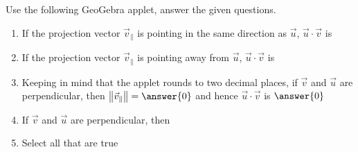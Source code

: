 \documentclass{ximera}
\begin{document}
\begin{exploration}
   Use the following GeoGebra applet, answer the given questions.

   \begin{center}
   \end{center}



   \begin{enumerate}
      \item If the projection vector $\vec{v}_\parallel$ is pointing in the same direction as $\vec{u}$, $\vec{u}\cdot\vec{v}$ is 

      \item If the projection vector $\vec{v}_\parallel$ is pointing away from $\vec{u}$, $\vec{u}\cdot\vec{v}$ is 

      \item Keeping in mind that the applet rounds to two decimal places, if $\vec{v}$ and $\vec{u}$ are perpendicular, then $\left\|\vec{v}_\parallel\right\|=\answer{0}$ and hence $\vec{u}\cdot\vec{v}$ is $\answer{0}$

      \item If $\vec{v}$ and $\vec{u}$ are perpendicular, then \begin{selectAll}
      \end{selectAll}

      \item Select all that are true \begin{selectAll}

      \end{selectAll}
   \end{enumerate}

\end{exploration}
\end{document}
